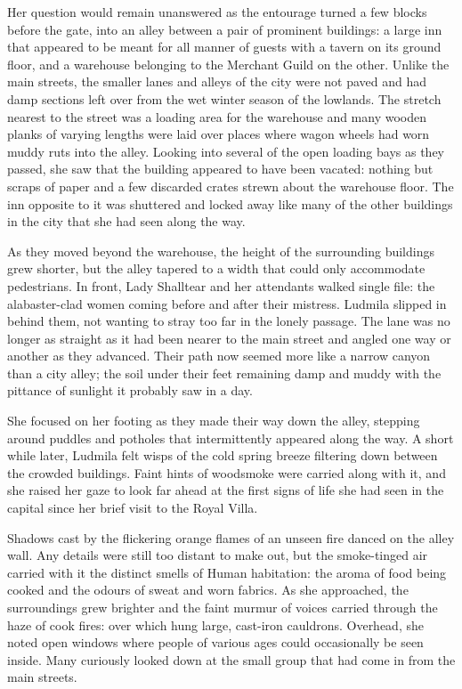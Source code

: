  

Her question would remain unanswered as the entourage turned a few blocks before the gate, into an alley between a pair of prominent buildings: a large inn that appeared to be meant for all manner of guests with a tavern on its ground floor, and a warehouse belonging to the Merchant Guild on the other. Unlike the main streets, the smaller lanes and alleys of the city were not paved and had damp sections left over from the wet winter season of the lowlands. The stretch nearest to the street was a loading area for the warehouse and many wooden planks of varying lengths were laid over places where wagon wheels had worn muddy ruts into the alley. Looking into several of the open loading bays as they passed, she saw that the building appeared to have been vacated: nothing but scraps of paper and a few discarded crates strewn about the warehouse floor. The inn opposite to it was shuttered and locked away like many of the other buildings in the city that she had seen along the way.

 

As they moved beyond the warehouse, the height of the surrounding buildings grew shorter, but the alley tapered to a width that could only accommodate pedestrians. In front, Lady Shalltear and her attendants walked single file: the alabaster-clad women coming before and after their mistress. Ludmila slipped in behind them, not wanting to stray too far in the lonely passage. The lane was no longer as straight as it had been nearer to the main street and angled one way or another as they advanced. Their path now seemed more like a narrow canyon than a city alley; the soil under their feet remaining damp and muddy with the pittance of sunlight it probably saw in a day.

 

She focused on her footing as they made their way down the alley, stepping around puddles and potholes that intermittently appeared along the way. A short while later, Ludmila felt wisps of the cold spring breeze filtering down between the crowded buildings. Faint hints of woodsmoke were carried along with it, and she raised her gaze to look far ahead at the first signs of life she had seen in the capital since her brief visit to the Royal Villa.

 

Shadows cast by the flickering orange flames of an unseen fire danced on the alley wall. Any details were still too distant to make out, but the smoke-tinged air carried with it the distinct smells of Human habitation: the aroma of food being cooked and the odours of sweat and worn fabrics. As she approached, the surroundings grew brighter and the faint murmur of voices carried through the haze of cook fires: over which hung large, cast-iron cauldrons. Overhead, she noted open windows where people of various ages could occasionally be seen inside. Many curiously looked down at the small group that had come in from the main streets.

